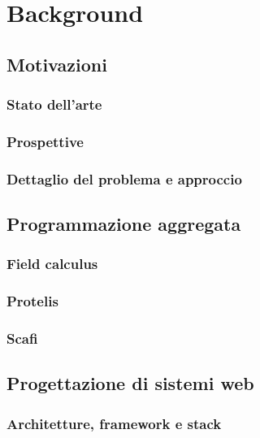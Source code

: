 \documentclass[%
  a4paper,                %
  12pt,                   %
  twoside,                %
  openright,              %
  titlepage,              %
  final                   %
]{scrbook}
\begin{document}
  \frontmatter{}

  
  
  
  

  \tableofcontents

  \mainmatter{}


  \part{Background}
    \chapter{Motivazioni}
      \section{Stato dell'arte}
      \section{Prospettive}
      \section{Dettaglio del problema e approccio}

    \chapter{Programmazione aggregata}
      \section{Field calculus}
      \section{Protelis}
      \section{Scafi}

    \chapter{Progettazione di sistemi web}
      \section{Architetture, framework e stack}
\end{document}
